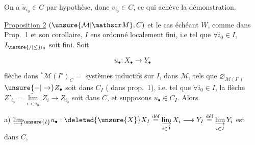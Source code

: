 

On a $\widetilde u_{i_0}\in C$ par hypothèse, donc $v_{i_0}\in C$, ce qui achève la démonstration.

\uline{Proposition 2} $(\unsure{\mathcal M|\mathscr M},C)$ et le cas échéant $W$, comme dans Prop.~1 et son corollaire, $I$ ens ordonné localement fini, i.e tel que $\forall i_0\in I$, $I_{\unsure{/|\leq}i_0}$ soit fini. Soit 

\[
 u_\bullet:X_\bullet\longrightarrow Y_\bullet
\]

flèche dans $ {}^{*}\mathcal M(I^\circ)_C={}$ systèmes inductifs sur $I$,  dans $\mathcal M$, tels
 que $\varnothing_{\mathcal M(I^\circ)}$ $\mathbin{\unsure{-|\to}} Z_\bullet$ soit dans $C_I$ ( dans prop.~1), i.e. tel que $\forall i_0\in I$, la flèche $Z'_{i_0}=\underset{i<i_0}{\underrightarrow{\lim}}\,Z_i\longrightarrow Z_{i_0}$ soit dans $C$, et supposons $u_\bullet\in C_I$. Alors

a) $\underrightarrow{\lim}_{\unsure{I}}u_\bullet:\deleted{\unsure{X}}X_I\overset{\text{déf}}{=}\underset{i\in I}{\underrightarrow{\lim}}\,X_i\longrightarrow Y_I\overset{\text{déf}}{=}\underset{i\in I}{\underrightarrow{\lim}}\,Y_i$ est dans $C$,

